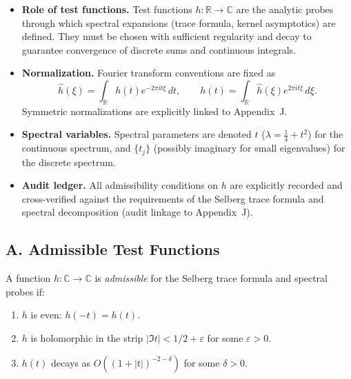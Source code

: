 \begin{tcolorbox}[colback=gray!5,colframe=gray!35,title=Scope \& Assumptions (MEA-Core-SS • enforced)]
\begin{itemize}
  \item \textbf{Role of test functions.} Test functions $h:\mathbb{R}\to\mathbb{C}$ are the analytic probes
        through which spectral expansions (trace formula, kernel asymptotics) are defined. They must be chosen
        with sufficient regularity and decay to guarantee convergence of discrete sums and continuous integrals.
  \item \textbf{Normalization.} Fourier transform conventions are fixed as
        \[
           \hat h(\xi) = \int_{\mathbb{R}} h(t) e^{-2\pi i t \xi}\,dt, \qquad
           h(t) = \int_{\mathbb{R}} \hat h(\xi) e^{2\pi i t \xi}\,d\xi.
        \]
        Symmetric normalizations are explicitly linked to Appendix~J.
  \item \textbf{Spectral variables.} Spectral parameters are denoted $t$ ($\lambda=\tfrac14+t^2$) for the continuous spectrum,
        and $\{t_j\}$ (possibly imaginary for small eigenvalues) for the discrete spectrum.
  \item \textbf{Audit ledger.} All admissibility conditions on $h$ are explicitly recorded and cross-verified against the requirements
        of the Selberg trace formula and spectral decomposition (audit linkage to Appendix~J).
\end{itemize}
\end{tcolorbox}

\subsection*{A. Admissible Test Functions}
\label{subsec:admissible-h}

\begin{definition}
A function $h:\mathbb{C}\to\mathbb{C}$ is \emph{admissible} for the Selberg trace formula and spectral probes if:
\begin{enumerate}[label=(\roman*)]
  \item $h$ is even: $h(-t)=h(t)$.
  \item $h$ is holomorphic in the strip $|\Im t|<1/2+\varepsilon$ for some $\varepsilon>0$.
  \item $h(t)$ decays as $O((1+|t|)^{-2-\delta})$ for some $\delta>0$.
\end{enumerate}
\end{definition}


